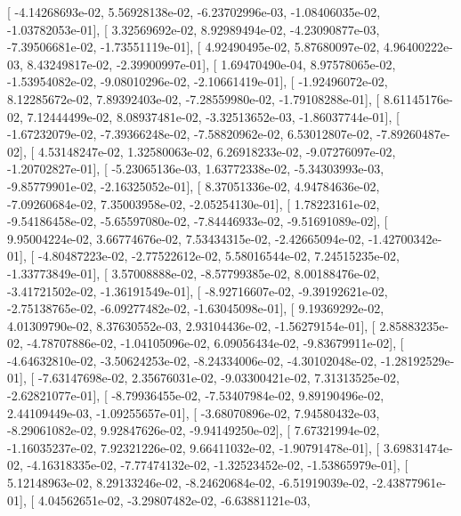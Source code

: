 \documentclass{article}
\begin{document}
       [ -4.14268693e-02,   5.56928138e-02,  -6.23702996e-03,
         -1.08406035e-02,  -1.03782053e-01],
       [  3.32569692e-02,   8.92989494e-02,  -4.23090877e-03,
         -7.39506681e-02,  -1.73551119e-01],
       [  4.92490495e-02,   5.87680097e-02,   4.96400222e-03,
          8.43249817e-02,  -2.39900997e-01],
       [  1.69470490e-04,   8.97578065e-02,  -1.53954082e-02,
         -9.08010296e-02,  -2.10661419e-01],
       [ -1.92496072e-02,   8.12285672e-02,   7.89392403e-02,
         -7.28559980e-02,  -1.79108288e-01],
       [  8.61145176e-02,   7.12444499e-02,   8.08937481e-02,
         -3.32513652e-03,  -1.86037744e-01],
       [ -1.67232079e-02,  -7.39366248e-02,  -7.58820962e-02,
          6.53012807e-02,  -7.89260487e-02],
       [  4.53148247e-02,   1.32580063e-02,   6.26918233e-02,
         -9.07276097e-02,  -1.20702827e-01],
       [ -5.23065136e-03,   1.63772338e-02,  -5.34303993e-03,
         -9.85779901e-02,  -2.16325052e-01],
       [  8.37051336e-02,   4.94784636e-02,  -7.09260684e-02,
          7.35003958e-02,  -2.05254130e-01],
       [  1.78223161e-02,  -9.54186458e-02,  -5.65597080e-02,
         -7.84446933e-02,  -9.51691089e-02],
       [  9.95004224e-02,   3.66774676e-02,   7.53434315e-02,
         -2.42665094e-02,  -1.42700342e-01],
       [ -4.80487223e-02,  -2.77522612e-02,   5.58016544e-02,
          7.24515235e-02,  -1.33773849e-01],
       [  3.57008888e-02,  -8.57799385e-02,   8.00188476e-02,
         -3.41721502e-02,  -1.36191549e-01],
       [ -8.92716607e-02,  -9.39192621e-02,  -2.75138765e-02,
         -6.09277482e-02,  -1.63045098e-01],
       [  9.19369292e-02,   4.01309790e-02,   8.37630552e-03,
          2.93104436e-02,  -1.56279154e-01],
       [  2.85883235e-02,  -4.78707886e-02,  -1.04105096e-02,
          6.09056434e-02,  -9.83679911e-02],
       [ -4.64632810e-02,  -3.50624253e-02,  -8.24334006e-02,
         -4.30102048e-02,  -1.28192529e-01],
       [ -7.63147698e-02,   2.35676031e-02,  -9.03300421e-02,
          7.31313525e-02,  -2.62821077e-01],
       [ -8.79936455e-02,  -7.53407984e-02,   9.89190496e-02,
          2.44109449e-03,  -1.09255657e-01],
       [ -3.68070896e-02,   7.94580432e-03,  -8.29061082e-02,
          9.92847626e-02,  -9.94149250e-02],
       [  7.67321994e-02,  -1.16035237e-02,   7.92321226e-02,
          9.66411032e-02,  -1.90791478e-01],
       [  3.69831474e-02,  -4.16318335e-02,  -7.77474132e-02,
         -1.32523452e-02,  -1.53865979e-01],
       [  5.12148963e-02,   8.29133246e-02,  -8.24620684e-02,
         -6.51919039e-02,  -2.43877961e-01],
       [  4.04562651e-02,  -3.29807482e-02,  -6.63881121e-03,
\end{document}
